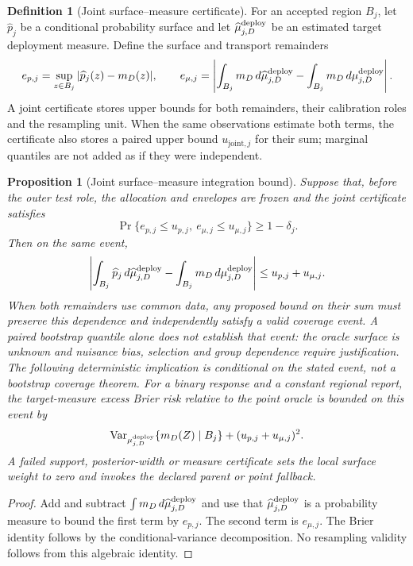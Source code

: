 \documentclass[11pt,a4paper]{article}
\numberwithin{equation}{section}
\newtheorem{proposition}[theorem]{Proposition}
\theoremstyle{definition}\newtheorem{definition}[theorem]{Definition}
\theoremstyle{remark}\newtheorem{remark}[theorem]{Remark}
\begin{document}
\begin{definition}[Joint surface--measure certificate]\label{def:jointmeasure}
For an accepted region $B_j$, let $\widehat p_j$ be a conditional probability surface and let $\widehat\mu_{j,D}^{\rm deploy}$ be an estimated target deployment measure. Define the surface and transport remainders
\[
 e_{p,j}=\sup_{z\in B_j}|\widehat p_j(z)-m_D(z)|,
 \qquad
 e_{\mu,j}=\left|\int_{B_j}m_D\,d\widehat\mu_{j,D}^{\rm deploy}-
                         \int_{B_j}m_D\,d\mu_{j,D}^{\rm deploy}\right| .
\]
A joint certificate stores upper bounds for both remainders, their calibration roles and the resampling unit. When the same observations estimate both terms, the certificate also stores a paired upper bound $u_{\mathrm{joint},j}$ for their sum; marginal quantiles are not added as if they were independent.
\end{definition}

\begin{proposition}[Joint surface--measure integration bound]\label{prop:jointmeasure}
Suppose that, before the outer test role, the allocation and envelopes are frozen and the joint certificate satisfies
\[
 \Pr\{e_{p,j}\le u_{p,j},\ e_{\mu,j}\le u_{\mu,j}\}\ge 1-\delta_j .
\]
Then on the same event,
\[
 \left|\int_{B_j}\widehat p_j\,d\widehat\mu_{j,D}^{\rm deploy}-
        \int_{B_j}m_D\,d\mu_{j,D}^{\rm deploy}\right|
 \le u_{p,j}+u_{\mu,j} .
\]
When both remainders use common data, any proposed bound on their sum must preserve this dependence and independently satisfy a valid coverage event. A paired bootstrap quantile alone does not establish that event: the oracle surface is unknown and nuisance bias, selection and group dependence require justification. The following deterministic implication is conditional on the stated event, not a bootstrap coverage theorem. For a binary response and a constant regional report, the target-measure excess Brier risk relative to the point oracle is bounded on this event by
\[
 \operatorname{Var}_{\mu_{j,D}^{\rm deploy}}\{m_D(Z)\mid B_j\}+
 (u_{p,j}+u_{\mu,j})^2 .
\]
A failed support, posterior-width or measure certificate sets the local surface weight to zero and invokes the declared parent or point fallback.
\end{proposition}
\begin{proof}
Add and subtract $\int m_D\,d\widehat\mu_{j,D}^{\rm deploy}$ and use that $\widehat\mu_{j,D}^{\rm deploy}$ is a probability measure to bound the first term by $e_{p,j}$. The second term is $e_{\mu,j}$. The Brier identity follows by the conditional-variance decomposition. No resampling validity follows from this algebraic identity.
\end{proof}
\end{document}
